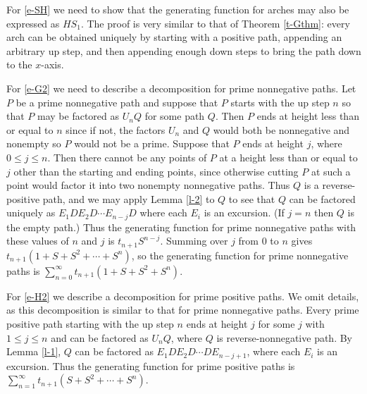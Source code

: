 \documentclass[12pt,reqno, oneside]{amsart}
\begin{document}
For \eqref{e-SH} we need to show that the generating function for arches may also be expressed as $H S_1$. The proof is very similar to that of Theorem \ref{t-Gthm}: every arch can be obtained uniquely by starting with a positive path,  appending an arbitrary up step, and then appending enough down steps to bring the path down to the $x$-axis. 



For \eqref{e-G2} we need to describe a decomposition for prime nonnegative paths. Let $P$ be a prime nonnegative path and suppose that $P$ starts with the up step $n$ so that $P$ may be factored as $U_nQ$ for some path $Q$. 
Then $P$ ends at height less than or equal to $n$ since if not, the factors $U_n$ and $Q$ would both be nonnegative and nonempty so $P$ would not be a prime. Suppose that $P$ ends at height $j$, where $0\le j \le n$. Then there cannot be any points of $P$ 
at a height less than or equal to $j$ other than the starting and ending points, since otherwise cutting $P$ at such a point would factor it into two nonempty nonnegative paths. Thus $Q$ is a reverse-positive path, and we may apply Lemma \ref{l-2} to $Q$ to see that $Q$ can be factored uniquely as 
$E_1D E_2 D \cdots E_{n-j}D$ where each $E_i$ is an excursion. (If $j=n$ then $Q$ is the empty path.) Thus the generating function for prime nonnegative paths with these values of $n$ and $j$ is $t_{n+1} S^{n-j}$. Summing over $j$ from 0 to $n$  gives $t_{n+1}(1+S+S^2 +  \cdots + S^{n})$, so the generating function for prime nonnegative paths is 
$\sum_{n=0}^\infty t_{n+1}(1+S+S^2 + S^n)$.

%
%


For \eqref{e-H2} we describe a decomposition for prime positive paths. We omit  details, as this decomposition is similar to that for prime nonnegative paths. Every prime positive path starting with the up step $n$ ends at height $j$ for some $j$ 
with $1\le j\le n$ and can be factored as $U_nQ$, where $Q$ is reverse-nonnegative path. By Lemma \ref{l-1}, $Q$ can be factored as 
$E_1 D E_2 D \cdots D E_{n-j+1}$, where each $E_i$ is an excursion.  Thus the generating function for prime positive paths is 
$\sum_{n=1}^\infty t_{n+1}(S+S^2 +\cdots+ S^n)$.
\end{document}
